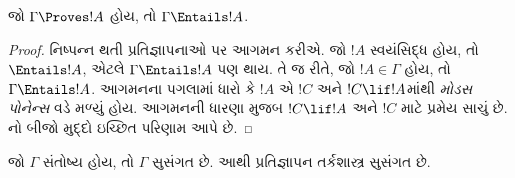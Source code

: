 \documentclass[../../../include/open-logic-section]{subfiles}
\begin{document}


\begin{thm}[યથાર્થતા]
જો $\Gamma\Proves!A$ હોય, તો $\Gamma \Entails !A$.
\end{thm}

\begin{proof}
નિષ્પન્ન થતી પ્રતિજ્ઞાપનાઓ પર આગમન કરીએ.
જો $!A$ સ્વયંસિદ્ધ હોય, તો $\Entails
!A$, એટલે $\Gamma \Entails!A$ પણ થાય.
તે જ રીતે, જો $!A \in \Gamma$ હોય, તો $\Gamma \Entails!A$.
આગમનના પગલામાં ધારો કે $!A$ એ $!C$ અને $!C\lif!A$માંથી
\emph{મોડસ પોનેન્સ} વડે મળ્યું હોય.
આગમનની ધારણા મુજબ $!C\lif !A$ અને $!C$ માટે પ્રમેય સાચું છે.
નો બીજો મુદ્દો
ઇચ્છિત પરિણામ આપે છે.
\end{proof}

\begin{cor}
જો $\Gamma$ સંતોષ્ય હોય, તો $\Gamma$ સુસંગત છે.
આથી પ્રતિજ્ઞાપન તર્કશાસ્ત્ર સુસંગત છે.
\end{cor}
\end{document}
